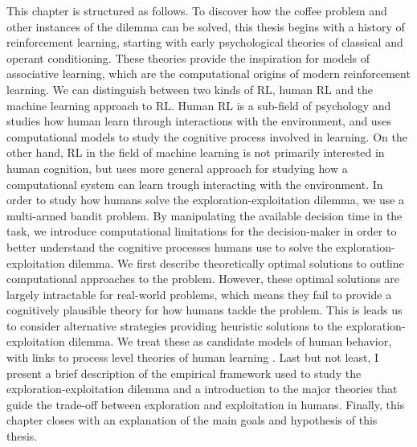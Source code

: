  
This chapter is structured as follows. %
To discover how the coffee problem and other instances of the dilemma can be solved, this thesis begins with a history of reinforcement learning, starting with early psychological theories of classical and operant conditioning. %
These theories provide the inspiration for models of associative learning, which are the computational origins of modern reinforcement learning. We can distinguish between two kinds of RL, human RL and the machine learning approach to RL. Human RL is a sub-field of psychology and studies how human learn through interactions with the environment, and uses computational models to study the cognitive process involved in learning. On the other hand, RL in the field of machine learning is not primarily interested in human cognition, but uses more general approach for studying how a computational system can learn trough interacting with the environment.
In order to study how humans solve the exploration-exploitation dilemma, we use a multi-armed bandit problem. %
By manipulating the available decision time in the task, we introduce computational limitations for the decision-maker in order to better understand the cognitive processes humans use to solve the exploration-exploitation dilemma. %
We first describe theoretically optimal solutions to outline computational approaches to the problem. However, these optimal solutions are largely intractable for real-world problems, which means they fail to provide a cognitively plausible theory for how humans tackle the problem. 
This is leads us to consider alternative strategies providing heuristic solutions to the exploration-exploitation dilemma. We treat these as candidate models of human behavior, with links to process level theories of human learning \citep{marr1976understanding}. 
Last but not least, I present a brief description of the empirical framework used to study the exploration-exploitation dilemma and a introduction to the major theories that guide the trade-off between exploration and exploitation in humans. 
Finally, this chapter closes with an explanation of the main goals and hypothesis of this thesis. 

